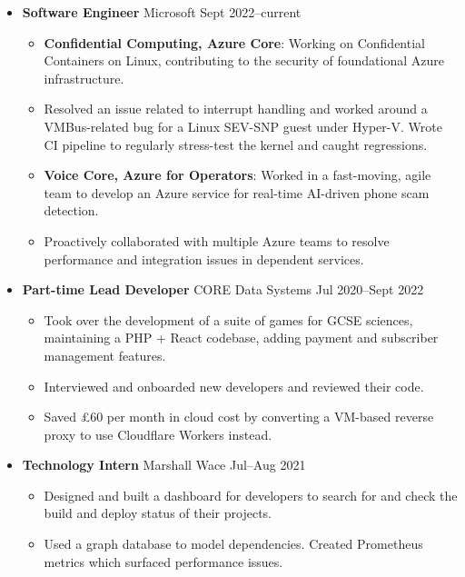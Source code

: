   \begin{itemize}
    \item \textbf{Software Engineer} %
    \dashdiv{} Microsoft \dashdiv{} Sept 2022--current

    \begin{itemize}
      \item \textbf{Confidential Computing, Azure Core}: Working on Confidential Containers on Linux, contributing to the security of foundational Azure infrastructure.
      \item Resolved an issue related to interrupt handling and worked around a VMBus-related bug for a Linux SEV-SNP guest under Hyper-V. Wrote CI pipeline to regularly stress-test the kernel and caught regressions.
    \end{itemize}

    \begin{itemize}
      \item \textbf{Voice Core, Azure for Operators}: Worked in a fast-moving, agile team to develop an Azure service for real-time AI-driven phone scam detection.
      \item Proactively collaborated with multiple Azure teams to resolve performance and integration issues in dependent services.
    \end{itemize}

    \item \textbf{Part-time Lead Developer} \dashdiv{} CORE Data Systems \dashdiv{} Jul 2020--Sept 2022

    \begin{itemize}
      \item Took over the development of a suite of games for GCSE sciences, maintaining a PHP + React codebase, adding payment and subscriber management features.
      \item Interviewed and onboarded new developers and reviewed their code.
      \item Saved £60 per month in cloud cost by converting a VM-based reverse proxy to use Cloudflare Workers instead.
    \end{itemize}

    \item \textbf{Technology Intern} \dashdiv{} Marshall Wace \dashdiv{} Jul--Aug 2021

    \begin{itemize}
      \item Designed and built a dashboard for developers to search for and check the build and deploy status of their projects.
      \item Used a graph database to model dependencies. Created Prometheus metrics which surfaced performance issues.
    \end{itemize}
  \end{itemize}

